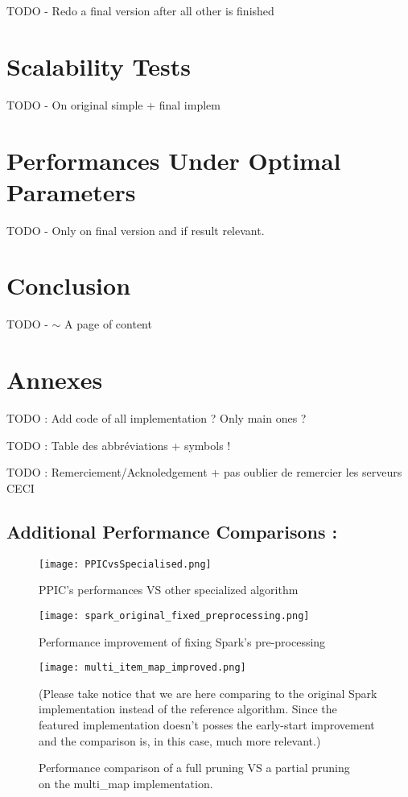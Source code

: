 \documentclass{eplmastersthesis}
\begin{document}
TODO - Redo a final version after all other is finished

\section{Scalability Tests}

TODO - On original simple + final implem

\section{Performances Under Optimal Parameters}

TODO - Only on final version and if result relevant.

\section{Conclusion}

TODO - $\sim$ A page of content

\section{Annexes}

TODO : Add code of all implementation ? Only main ones ?

TODO : Table des abbréviations + symbols !

TODO : Remerciement/Acknoledgement + pas oublier de remercier les serveurs CECI

\subsection{Additional Performance Comparisons :}

\begin{figure}[H]
  \centering
  \texttt{[image: PPICvsSpecialised.png]}
  \caption{PPIC's performances VS other specialized algorithm}
  \label{PPIC's perfomance against other specialized implementations}
\end{figure}

\begin{figure}[H]
  \centering
  \texttt{[image: spark\_original\_fixed\_preprocessing.png]}
  \caption{Performance improvement of fixing Spark's pre-processing}
  \label{spark_preprocessing_fix}
\end{figure}

\begin{figure}[H]
  \centering
  \texttt{[image: multi\_item\_map\_improved.png]}
  \caption[PPIC with a map structure]{
  		Performance comparison of a full pruning VS a partial pruning \\ 
  		on the \textrm{multi\_map} implementation.
  	\endtabular
  }
  (Please take notice that we are here comparing to the original Spark implementation instead of the reference algorithm. Since the featured implementation doesn't posses the early-start improvement and the comparison is, in this case, much more relevant.)
  \label{fig:multi_map_comp}
\end{figure}
\end{document}
